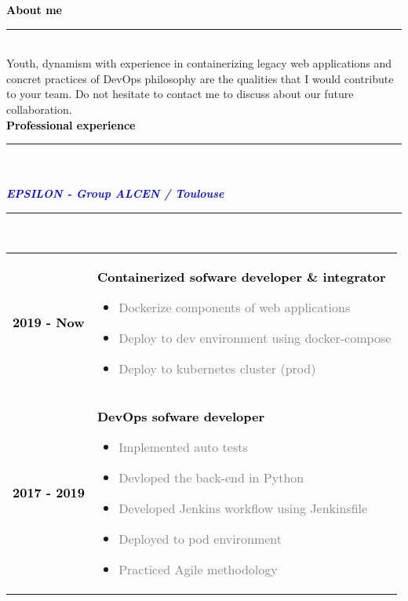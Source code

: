 \documentclass[12pt,A4]{article}
\begin{document}
\begin{minipage}[t]{0.68\textwidth}
%
%
\textcolor{black}{\large \bf About me \vspace{-5pt}\\}
\noindent\textcolor{blue}{\rule{13cm}{.8mm}}\\
%
\hspace*{5mm}
Youth, dynamism with experience in containerizing legacy web applications and concret practices of DevOps philosophy  are the qualities that I would contribute to your team.
Do not hesitate to contact me to discuss about our future collaboration.
%
%
\vspace*{1cm}\\
\textcolor{black}{\large \bf Professional experience \vspace{-5pt}\\}
\noindent\textcolor{blue}{\rule{13cm}{.8mm}}\\
%
\vspace*{-5pt}\\
\textcolor{blue}{\bf \textit{EPSILON - Group ALCEN / Toulouse}}\hfill\textcolor{gray!40}{\rule{5cm}{2mm}}\\
\begin{tabular}{P{2.5cm}p{10cm}}
\textcolor{black}{\bf 2019 - Now} & \textcolor{black}{\bf Containerized sofware developer \& integrator}
\begin{itemize}
  \item \small \textcolor{gray}{Dockerize components of web applications}
  \item \small \textcolor{gray}{Deploy to dev environment using docker-compose}
  \item \small \textcolor{gray}{Deploy to kubernetes cluster (prod)}
\end{itemize}\\
\textcolor{black}{\bf 2017 - 2019} & \textcolor{black}{\bf DevOps sofware developer}
\begin{itemize}
  \item \small \textcolor{gray}{Implemented auto tests}
  \item \small \textcolor{gray}{Devloped the back-end in Python}
  \item \small \textcolor{gray}{Developed Jenkins workflow using Jenkinsfile}
  \item \small \textcolor{gray}{Deployed to pod environment}
  \item \small \textcolor{gray}{Practiced Agile methodology}
\end{itemize}\\

\end{tabular}
\end{minipage}
\end{document}
